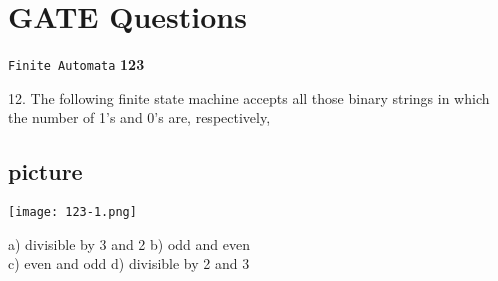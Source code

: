 \documentclass[9pt]{beamer}
\begin{document}
\begin{frame}
\section*{GATE Questions}
\begin{flushright}
 \texttt{Finite Automata} \hspace*{1cm} \textbf{123}
\end{flushright}

\vspace*{0.5cm}
12. The following finite state machine accepts all those binary strings in which the number of 1’s and
0’s are, respectively,\\

\begin{center}
\section{picture}
\texttt{[image: 123-1.png]}
\end{center}

\vspace*{0.2cm}
\hspace{0.5cm}
a) divisible by 3 and 2     \hspace{0.5cm}   b) odd and even \\
\hspace{0.5cm}
c) even and odd             \hspace{1cm}   d) divisible by 2 and 3 \\
\vspace*{0.2cm}

\vspace*{0.2cm}
\end{frame}
\end{document}
